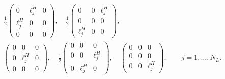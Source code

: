\begin{note}[方法(8.288)的实现]
\[\begin{gathered}
 \frac12\begin{pmatrix}0&\ell_j^H&0\\\ell_j^H&0&0\\0&0&0\end{pmatrix},\quad
 \frac12\begin{pmatrix}0&0&\ell_j^H\\0&0&0\\\ell_j^H&0&0\end{pmatrix},\\[2mm]
 \begin{pmatrix}0&0&0\\0&\ell_j^H&0\\0&0&0\end{pmatrix},\quad
 \frac12\begin{pmatrix}0&0&0\\0&0&\ell_j^H\\0&\ell_j^H&0\end{pmatrix},\quad
 \begin{pmatrix}0&0&0\\0&0&0\\0&0&\ell_j^H\end{pmatrix},
 \qquad j=1,\ldots,N_L.
\end{gathered}
\]


\end{note}

